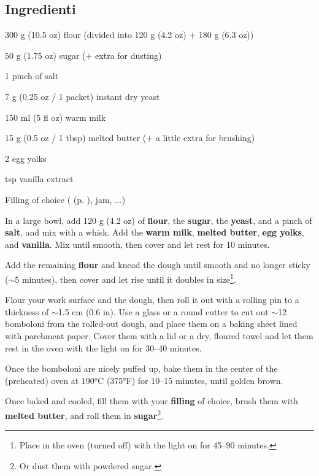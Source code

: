 \newpage
{}

\subsection*{Ingredienti}
\begin{ingredients}
	\item 300 g (10.5 oz) flour (divided into 120 g (4.2 oz) + 180 g (6.3 oz))
	\item 50 g (1.75 oz) sugar ($+$ extra for dusting)
	\item 1 pinch of salt
	\item 7 g (0.25 oz / 1 packet) instant dry yeast
	\item 150 ml (5 fl oz) warm milk
	\item 15 g (0.5 oz / 1 tbsp) melted butter ($+$ a little extra for brushing)
	\item 2 egg yolks
	\item {} tsp vanilla extract
	\item Filling of choice (\textit{} (p. \pageref{crema_pasticcera}), jam, ...)
\end{ingredients}

\medskip

In a large bowl, add 120 g (4.2 oz) of \textbf{flour}, the \textbf{sugar}, the \textbf{yeast}, and a pinch of \textbf{salt}, and mix with a whisk. 
Add the \textbf{warm milk}, \textbf{melted butter}, \textbf{egg yolks}, and \textbf{vanilla}. 
Mix until smooth, then cover and let rest for 10 minutes. 

Add the remaining \textbf{flour} and knead the dough until smooth and no longer sticky ($\sim$5 minutes), then cover and let rise until it doubles in size\footnote{Place in the oven (turned off) with the light on for 45--90 minutes.}.

Flour your work surface and the dough, then roll it out with a rolling pin to a thickness of $\sim$1.5 cm (0.6 in). 
Use a glass or a round cutter to cut out $\sim$12 bomboloni from the rolled-out dough, and place them on a baking sheet lined with parchment paper.
Cover them with a lid or a dry, floured towel and let them rest in the oven with the light on for 30--40 minutes. 

Once the bomboloni are nicely puffed up, bake them in the center of the (preheated) oven at 190°C (375°F) for 10--15 minutes, until golden brown. 

Once baked and cooled, fill them with your \textbf{filling} of choice, brush them with \textbf{melted butter}, and roll them in \textbf{sugar}\footnote{Or dust them with powdered sugar.}. 


\vspace*{0.75 cm}

\begin{recipeblock}
	\noindent 
\end{recipeblock}